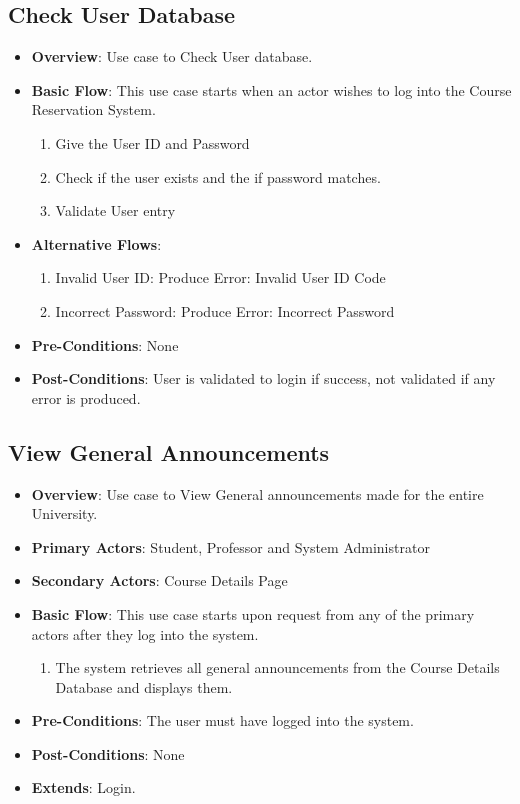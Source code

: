 \documentclass[12pt, a4]{article}
\begin{document}
\subsection{Check User Database}
\begin{itemize}
    \item \textbf{Overview}: Use case to Check User database.
    \item \textbf{Basic Flow}: This use case starts when an actor wishes to log into the Course Reservation System.
        \begin{enumerate}
            \item Give the User ID and Password
            \item Check if the user exists and the if password matches.
            \item Validate User entry
        \end{enumerate}
    \item \textbf{Alternative Flows}:
        \begin{enumerate}
            \item Invalid User ID: Produce Error: Invalid User ID Code
            \item Incorrect Password: Produce Error: Incorrect Password
        \end{enumerate}
    \item \textbf{Pre-Conditions}: None
    \item \textbf{Post-Conditions}: User is validated to login if success, not validated if any error is produced.
\end{itemize}


\subsection{View General Announcements}
\begin{itemize}
    \item \textbf{Overview}: Use case to View General announcements made for the entire University.
    \item \textbf{Primary Actors}: Student, Professor and System Administrator
    \item \textbf{Secondary Actors}: Course Details Page
    \item \textbf{Basic Flow}: This use case starts upon request from any of the primary actors after they log into the system.
        \begin{enumerate}
            \item The system retrieves all general announcements from the Course Details Database and displays them.
        \end{enumerate}
    \item \textbf{Pre-Conditions}: The user must have logged into the system.
    \item \textbf{Post-Conditions}: None
    \item \textbf{Extends}: Login.
\end{itemize}
\end{document}
